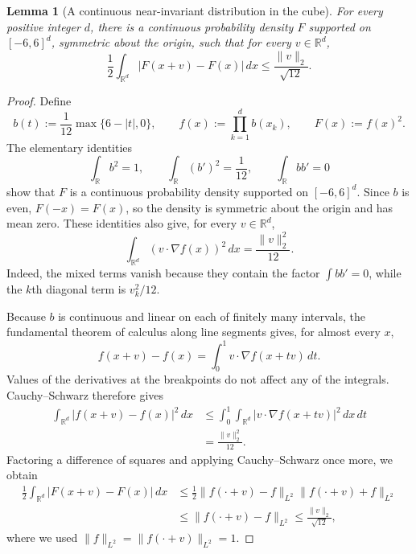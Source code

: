 \documentclass[10pt,a4paper]{amsart}
\newtheorem{lemma}[theorem]{Lemma}
\newcommand{\R}{\mathbb{R}}
\begin{document}
\begin{lemma}[A continuous near-invariant distribution in the cube]
\label{lemma:continuous-cube}
For every positive integer $d$, there is a continuous probability
density $F$ supported on $[-6,6]^d$, symmetric about the origin,
such that for every $v\in\R^d$,
\[
\frac12\int_{\R^d}|F(x+v)-F(x)|\,dx
\le\frac{\|v\|_2}{\sqrt{12}}.
\]
\end{lemma}

\begin{proof}
Define
\[
b(t):=\frac1{12}\max\{6-|t|,0\},
\qquad
f(x):=\prod_{k=1}^d b(x_k),
\qquad
F(x):=f(x)^2.
\]
The elementary identities
\[
\int_{\R}b^2=1,
\qquad
\int_{\R}(b')^2=\frac1{12},
\qquad
\int_{\R}bb'=0
\]
show that $F$ is a continuous probability density supported on
$[-6,6]^d$. Since $b$ is even, $F(-x)=F(x)$, so the density is
symmetric about the origin and has mean zero.
These identities also give, for every $v\in\R^d$,
\begin{equation}
\label{eq:directional-energy}
\int_{\R^d}(v\cdot\nabla f(x))^2\,dx
=\frac{\|v\|_2^2}{12}.
\end{equation}
Indeed, the mixed terms vanish because they contain the factor
$\int bb'=0$, while the $k$th diagonal term is $v_k^2/12$.

Because $b$ is continuous and linear on each of finitely many
intervals, the fundamental theorem of calculus along line segments
gives, for almost every $x$,
\[
f(x+v)-f(x)=\int_0^1 v\cdot\nabla f(x+tv)\,dt.
\]
Values of the derivatives at the breakpoints do not affect any
of the integrals. Cauchy--Schwarz therefore gives
\[
\begin{aligned}
\int_{\R^d}|f(x+v)-f(x)|^2\,dx
&\le\int_0^1\int_{\R^d}
   |v\cdot\nabla f(x+tv)|^2\,dx\,dt\\
&=\frac{\|v\|_2^2}{12}.
\end{aligned}
\]
Factoring a difference of squares and applying Cauchy--Schwarz
once more, we obtain
\begin{equation}
\label{eq:continuous-shift}
\begin{aligned}
\frac12\int_{\R^d}|F(x+v)-F(x)|\,dx
&\le\frac12\|f(\cdot+v)-f\|_{L^2}
                  \|f(\cdot+v)+f\|_{L^2}\\
&\le\|f(\cdot+v)-f\|_{L^2}
\le\frac{\|v\|_2}{\sqrt{12}},
\end{aligned}
\end{equation}
where we used $\|f\|_{L^2}=\|f(\cdot+v)\|_{L^2}=1$.
\end{proof}
\end{document}
